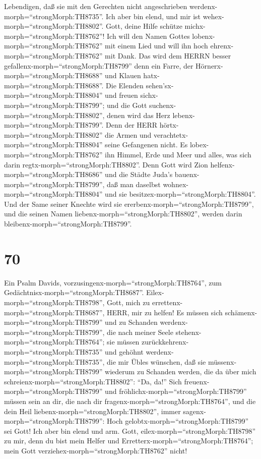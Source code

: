 Lebendigen, daß sie mit den Gerechten nicht angeschrieben
werdenx-morph=``strongMorph:TH8735''.  Ich aber bin elend,
und mir ist wehex-morph=``strongMorph:TH8802''. Gott, deine Hilfe
schütze michx-morph=``strongMorph:TH8762''!  Ich will den
Namen Gottes lobenx-morph=``strongMorph:TH8762'' mit einem Lied und will
ihn hoch ehrenx-morph=``strongMorph:TH8762'' mit Dank.  Das
wird dem HERRN besser gefallenx-morph=``strongMorph:TH8799'' denn ein
Farre, der Hörnerx-morph=``strongMorph:TH8688'' und Klauen
hatx-morph=``strongMorph:TH8688''.  Die Elenden
sehen'sx-morph=``strongMorph:TH8804'' und freuen
sichx-morph=``strongMorph:TH8799''; und die Gott
suchenx-morph=``strongMorph:TH8802'', denen wird das Herz
lebenx-morph=``strongMorph:TH8799''.  Denn der HERR
hörtx-morph=``strongMorph:TH8802'' die Armen und
verachtetx-morph=``strongMorph:TH8804'' seine Gefangenen nicht.
 Es lobex-morph=``strongMorph:TH8762'' ihn Himmel, Erde und
Meer und alles, was sich darin regtx-morph=``strongMorph:TH8802''.
 Denn Gott wird Zion helfenx-morph=``strongMorph:TH8686''
und die Städte Juda's bauenx-morph=``strongMorph:TH8799'', daß man
daselbst wohnex-morph=``strongMorph:TH8804'' und sie
besitzex-morph=``strongMorph:TH8804''.  Und der Same seiner
Knechte wird sie ererbenx-morph=``strongMorph:TH8799'', und die seinen
Namen liebenx-morph=``strongMorph:TH8802'', werden darin
bleibenx-morph=``strongMorph:TH8799''.

\hypertarget{section-69}{%
\section{70}\label{section-69}}

 Ein Psalm Davids,
vorzusingenx-morph=``strongMorph:TH8764'', zum
Gedächtnisx-morph=``strongMorph:TH8687''.
Eilex-morph=``strongMorph:TH8798'', Gott, mich zu
errettenx-morph=``strongMorph:TH8687'', HERR, mir zu helfen!
 Es müssen sich schämenx-morph=``strongMorph:TH8799'' und zu
Schanden werdenx-morph=``strongMorph:TH8799'', die nach meiner Seele
stehenx-morph=``strongMorph:TH8764''; sie müssen
zurückkehrenx-morph=``strongMorph:TH8735'' und gehöhnt
werdenx-morph=``strongMorph:TH8735'', die mir Übles wünschen,
 daß sie müssenx-morph=``strongMorph:TH8799'' wiederum zu
Schanden werden, die da über mich
schreienx-morph=``strongMorph:TH8802'': ``Da, da!''  Sich
freuenx-morph=``strongMorph:TH8799'' und
fröhlichx-morph=``strongMorph:TH8799'' müssen sein an dir, die nach dir
fragenx-morph=``strongMorph:TH8764'', und die dein Heil
liebenx-morph=``strongMorph:TH8802'', immer
sagenx-morph=``strongMorph:TH8799'': Hoch
gelobtx-morph=``strongMorph:TH8799'' sei Gott!  Ich aber bin
elend und arm. Gott, eilex-morph=``strongMorph:TH8798'' zu mir, denn du
bist mein Helfer und Erretterx-morph=``strongMorph:TH8764''; mein Gott
verziehex-morph=``strongMorph:TH8762'' nicht!

